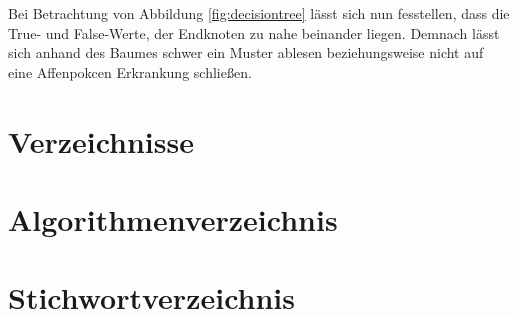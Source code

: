 \documentclass[13pt,a4paper, listof=entryprefix, bibliography=totocnumbered,toc=listofnumbered,lof=listofnumbered]{scrartcl}
\newcounter{verzeichnis}
\begin{document}
	Bei Betrachtung von Abbildung \ref{fig:decisiontree} lässt sich nun fesstellen, dass die True- und False-Werte,
	der Endknoten zu nahe beinander liegen. Demnach lässt sich anhand des Baumes schwer ein Muster ablesen beziehungsweise
	nicht auf eine Affenpokcen Erkrankung schließen.  

		\pagebreak

		 \label{Verzeichnisse}
		\renewcommand{\thesection}{\Roman{verzeichnis}}
		\section*{Verzeichnisse} 
   		 \label{Literaturverzeichnis}
		\renewcommand{\refname}{Literaturverzeichnis}
		\printbibliography
		\pagebreak

		\listoffigures
		\pagebreak


		\listoftables
		\pagebreak

        \lstlistoflistings
        \pagebreak


        \section{Algorithmenverzeichnis}
        \vspace{-2em}



\pagebreak
{}
\section{Stichwortverzeichnis}

\vspace{-3em}
\end{document}
